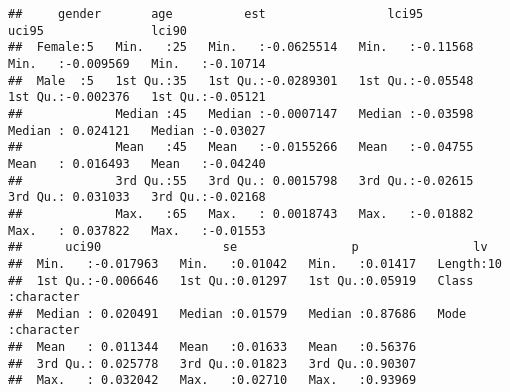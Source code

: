\documentclass[
]{article}
\begin{document}
\begin{verbatim}
##     gender       age          est                 lci95              uci95               lci90         
##  Female:5   Min.   :25   Min.   :-0.0625514   Min.   :-0.11568   Min.   :-0.009569   Min.   :-0.10714  
##  Male  :5   1st Qu.:35   1st Qu.:-0.0289301   1st Qu.:-0.05548   1st Qu.:-0.002376   1st Qu.:-0.05121  
##             Median :45   Median :-0.0007147   Median :-0.03598   Median : 0.024121   Median :-0.03027  
##             Mean   :45   Mean   :-0.0155266   Mean   :-0.04755   Mean   : 0.016493   Mean   :-0.04240  
##             3rd Qu.:55   3rd Qu.: 0.0015798   3rd Qu.:-0.02615   3rd Qu.: 0.031033   3rd Qu.:-0.02168  
##             Max.   :65   Max.   : 0.0018743   Max.   :-0.01882   Max.   : 0.037822   Max.   :-0.01553  
##      uci90                 se                p                lv           
##  Min.   :-0.017963   Min.   :0.01042   Min.   :0.01417   Length:10         
##  1st Qu.:-0.006646   1st Qu.:0.01297   1st Qu.:0.05919   Class :character  
##  Median : 0.020491   Median :0.01579   Median :0.87686   Mode  :character  
##  Mean   : 0.011344   Mean   :0.01633   Mean   :0.56376                     
##  3rd Qu.: 0.025778   3rd Qu.:0.01823   3rd Qu.:0.90307                     
##  Max.   : 0.032042   Max.   :0.02710   Max.   :0.93969
\end{verbatim}
\end{document}
